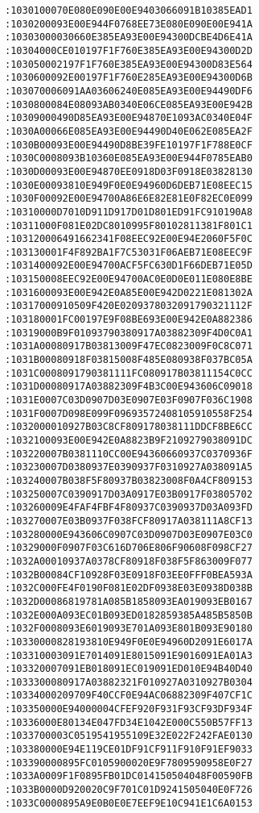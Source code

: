 \begin{lstlisting}[language={}, basicstyle=\scriptsize, caption=Машинний код]
:1030100070E080E090E00E9403066091B10385EAD1
:1030200093E00E944F0768EE73E080E090E00E941A
:10303000030660E385EA93E00E94300DCBE4D6E41A
:10304000CE010197F1F760E385EA93E00E94300D2D
:103050002197F1F760E385EA93E00E94300D83E564
:1030600092E00197F1F760E285EA93E00E94300D6B
:103070006091AA03606240E085EA93E00E94490DF6
:1030800084E08093AB0340E06CE085EA93E00E942B
:10309000490D85EA93E00E94870E1093AC0340E04F
:1030A00066E085EA93E00E94490D40E062E085EA2F
:1030B00093E00E94490D8BE39FE10197F1F788E0CF
:1030C0008093B10360E085EA93E00E944F0785EAB0
:1030D00093E00E94870EE0918D03F0918E03828130
:1030E00093810E949F0E0E94960D6DEB71E08EEC15
:1030F00092E00E94700A86E6E82E81E0F82EC0E099
:10310000D7010D911D917D01D801ED91FC910190A8
:10311000F081E02DC8010995F80102811381F801C1
:103120006491662341F08EEC92E00E94E2060F5F0C
:103130001F4F892BA1F7C53031F06AEB71E08EEC9F
:1031400092E00E94700ACF5FC630D1F66DEB71E05D
:103150008EEC92E00E94700AC0E0D0E011E080E8BE
:1031600093E00E942E0A85E00E942D0221E081302A
:10317000910509F420E0209378032091790321112F
:103180001FC00197E9F08BE693E00E942E0A882386
:10319000B9F01093790380917A03882309F4D0C0A1
:1031A00080917B03813009F47EC0823009F0C8C071
:1031B00080918F03815008F485E080938F037BC05A
:1031C0008091790381111FC080917B03811154C0CC
:1031D00080917A03882309F4B3C00E943606C09018
:1031E0007C03D0907D03E0907E03F0907F036C1908
:1031F0007D098E099F09693572408105910558F254
:1032000010927B03C8CF809178038111DDCF8BE6CC
:1032100093E00E942E0A8823B9F2109279038091DC
:103220007B0381110CC00E94360660937C0370936F
:103230007D0380937E0390937F0310927A038091A5
:103240007B038F5F80937B03823008F0A4CF809153
:103250007C0390917D03A0917E03B0917F03805702
:103260009E4FAF4FBF4F80937C0390937D03A093FD
:103270007E03B0937F038FCF80917A038111A8CF13
:103280000E943606C0907C03D0907D03E0907E03C0
:10329000F0907F03C616D706E806F90608F098CF27
:1032A00010937A0378CF80918F038F5F863009F077
:1032B00084CF10928F03E0918F03EE0FFF0BEA593A
:1032C000FE4F0190F081E02DF0938E03E0938D038B
:1032D00086819781A085B1858093EA019093EB0167
:1032E000A093EC01B093ED0182859385A485B5850B
:1032F0008093E6019093E701A093E801B093E90180
:10330000828193810E949F0E0E94960D2091E6017A
:103310003091E7014091E8015091E9016091EA01A3
:103320007091EB018091EC019091ED010E94B40D40
:1033300080917A03882321F010927A0310927B0304
:10334000209709F40CCF0E94AC06882309F407CF1C
:103350000E94000004CFEF920F931F93CF93DF934F
:10336000E80134E047FD34E1042E000C550B57FF13
:1033700003C0519541955109E32E022F242FAE0130
:103380000E94E119CE01DF91CF911F910F91EF9033
:103390000895FC0105900020E9F7809590958E0F27
:1033A0009F1F0895FB01DC014150504048F00590FB
:1033B0000D920020C9F701C01D9241505040E0F726
:1033C0000895A9E0B0E0E7EEF9E10C941E1C6A0153

\end{lstlisting}

